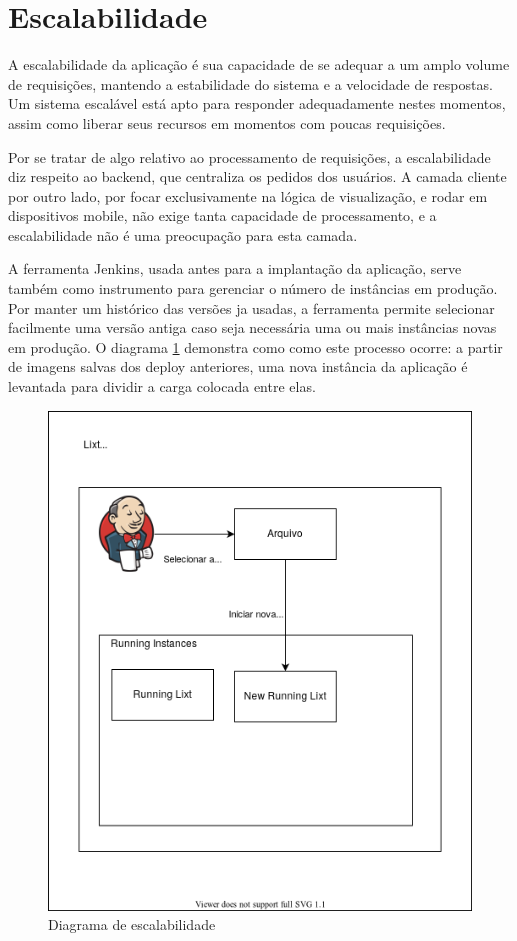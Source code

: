 \section{Escalabilidade}

A escalabilidade da aplicação é sua capacidade de se adequar a um
amplo volume de requisições, mantendo a estabilidade do sistema e a
velocidade de respostas. Um sistema escalável está apto para responder
adequadamente nestes momentos, assim como liberar seus recursos em
momentos com poucas requisições.

Por se tratar de algo relativo ao processamento de requisições, a
escalabilidade diz respeito ao \gls{backend}, que centraliza os
pedidos dos usuários. A camada cliente por outro lado, por focar
exclusivamente na lógica de visualização, e rodar em dispositivos
mobile, não exige tanta capacidade de processamento, e a
escalabilidade não é uma preocupação para esta camada.

A ferramenta Jenkins, usada antes para a implantação da aplicação,
serve também como instrumento para gerenciar o número de instâncias em
produção. Por manter um histórico das versões ja usadas, a ferramenta
permite selecionar facilmente uma versão antiga caso seja necessária
uma ou mais instâncias novas em produção. O diagrama
\ref{fig:escalabilidade} demonstra como como este processo ocorre: a
partir de imagens salvas dos \gls{deploy} anteriores, uma nova
instância da aplicação é levantada para dividir a carga colocada entre
elas.

\begin{figure}
  \centering
  \caption{Diagrama de escalabilidade}
  \label{fig:escalabilidade}
  \includegraphics[scale=0.50]{images/escalar}
\end{figure}

